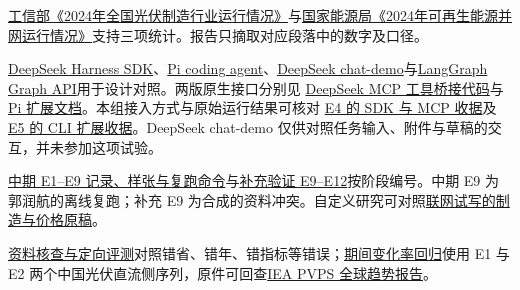 \documentclass[UTF8,12pt,fontset=none]{ctexart}
\newcommand{\chaptertitle}[1]{\vspace*{0pt}{\color{zblue}\fontsize{22}{26}\selectfont\bfseries #1\par}\vspace{3pt}{\color{hair}\hrule height .8pt}\vspace{6pt}}
\begin{document}
\clearpage
{}
\hypertarget{reportpart11}{}
\chaptertitle{参考资料与复核入口}
\href{https://wap.miit.gov.cn/gyhxxhb/jgsj/dzxxsnew/xyyx/art/2025/art\_1717bf6fa0a34311a2c347fb9623e607.html}{工信部《2024年全国光伏制造行业运行情况》}与\href{https://www.nea.gov.cn/20250221/e10f363cabe3458aaf78ba4558970054/c.html}{国家能源局《2024年可再生能源并网运行情况》}支持三项统计。报告只摘取对应段落中的数字及口径。\par
\href{https://github.com/deepseek-ai/deepseek-harness/tree/dsh-v0.2.2-rc.5/packages/bundle/sdk-minimal}{DeepSeek Harness SDK}、\href{https://github.com/earendil-works/pi/tree/v1.6.0/packages/coding-agent}{Pi coding agent}、\href{https://github.com/deepseek-ai/chat-demo}{DeepSeek chat-demo}与\href{https://docs.langchain.com/oss/python/langgraph/graph-api}{LangGraph Graph API}用于设计对照。两版原生接口分别见 \href{https://github.com/deepseek-ai/deepseek-harness/blob/dsh-v0.2.2-rc.5/packages/mcp/mcp-client/src/tools.ts\#L126-L177}{DeepSeek MCP 工具桥接代码}与 \href{https://github.com/earendil-works/pi/blob/v1.6.0/packages/coding-agent/docs/extensions.md}{Pi 扩展文档}。本组接入方式与原始运行结果可核对 \href{https://github.com/BrockPhlin/industry-report-harness/blob/ae07f1d/presentations/02-midterm/evidence/deepseek-harness.json}{E4 的 SDK 与 MCP 收据}及 \href{https://github.com/BrockPhlin/industry-report-harness/blob/ae07f1d/presentations/02-midterm/evidence/pi-cli.json}{E5 的 CLI 扩展收据}。DeepSeek chat-demo 仅供对照任务输入、附件与草稿的交互，并未参加这项试验。\par
\href{https://github.com/BrockPhlin/industry-report-harness/tree/cbbb1df/presentations/02-midterm/evidence}{中期 E1–E9 记录、样张与复跑命令}与\href{https://github.com/BrockPhlin/industry-report-harness/tree/7876b7c/presentations/03-final/evidence}{补充验证 E9–E12}按阶段编号。中期 E9 为郭润航的离线复跑；补充 E9 为合成的资料冲突。自定义研究可对照\href{https://github.com/BrockPhlin/industry-report-harness/blob/ae07f1d/presentations/02-midterm/evidence/\%E5\%B7\%A5\%E4\%BD\%9C\%E5\%8F\%B0\%E8\%81\%94\%E7\%BD\%91\%E7\%A0\%94\%E7\%A9\%B6\_2024\%E5\%B9\%B4\%E5\%88\%B6\%E9\%80\%A0\%E4\%B8\%8E\%E4\%BB\%B7\%E6\%A0\%BC.md}{联网试写的制造与价格原稿}。\par
\href{https://github.com/BrockPhlin/industry-report-harness/blob/d41a7c7/docs/\%E6\%8A\%A5\%E5\%91\%8A\%E6\%A0\%B8\%E6\%9F\%A5\%E4\%B8\%8E\%E4\%BF\%AE\%E8\%AE\%A2.md}{资料核查与定向评测}对照错省、错年、错指标等错误；\href{https://github.com/BrockPhlin/industry-report-harness/blob/d41a7c7/code/tests\_midterm/test\_series\_growth.py}{期间变化率回归}使用 E1 与 E2 两个中国光伏直流侧序列，原件可回查\href{https://iea-pvps.org/trends\_reports/trends-2026/}{IEA PVPS 全球趋势报告}。\par
\end{document}
